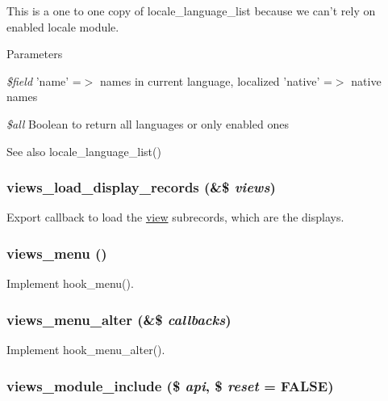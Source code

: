 This is a one to one copy of locale\_\-language\_\-list because we can't rely on enabled locale module.


\begin{DoxyParams}{Parameters}
\item[{\em \$field}]'name' =$>$ names in current language, localized 'native' =$>$ native names \item[{\em \$all}]Boolean to return all languages or only enabled ones\end{DoxyParams}
\begin{DoxySeeAlso}{See also}
locale\_\-language\_\-list() 
\end{DoxySeeAlso}
\hypertarget{views_8module_a5ba50dc2afc437f2faf7d956d6488eb1}{
\subsubsection[{views\_\-load\_\-display\_\-records}]{\setlength{\rightskip}{0pt plus 5cm}views\_\-load\_\-display\_\-records (\&\$ {\em views})}}
\label{views_8module_a5ba50dc2afc437f2faf7d956d6488eb1}
Export callback to load the \hyperlink{classview}{view} subrecords, which are the displays. \hypertarget{views_8module_ab62ba1ad3afe80e5bf544339a6a690b6}{
\subsubsection[{views\_\-menu}]{\setlength{\rightskip}{0pt plus 5cm}views\_\-menu ()}}
\label{views_8module_ab62ba1ad3afe80e5bf544339a6a690b6}
Implement hook\_\-menu(). \hypertarget{views_8module_a927f922bf3e583010e7deb46db1cbb4e}{
\subsubsection[{views\_\-menu\_\-alter}]{\setlength{\rightskip}{0pt plus 5cm}views\_\-menu\_\-alter (\&\$ {\em callbacks})}}
\label{views_8module_a927f922bf3e583010e7deb46db1cbb4e}
Implement hook\_\-menu\_\-alter(). \hypertarget{views_8module_a22df4c2332b9999ad29f8e2771cf63b1}{
\subsubsection[{views\_\-module\_\-include}]{\setlength{\rightskip}{0pt plus 5cm}views\_\-module\_\-include (\$ {\em api}, \/  \$ {\em reset} = {\ttfamily FALSE})}}
